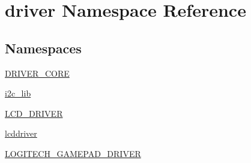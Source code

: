 \hypertarget{namespacedriver}{}\section{driver Namespace Reference}
\label{namespacedriver}
\subsection*{Namespaces}
\begin{DoxyCompactItemize}
\item 
 \hyperlink{namespacedriver_1_1DRIVER__CORE}{D\+R\+I\+V\+E\+R\+\_\+\+C\+O\+R\+E}
\item 
 \hyperlink{namespacedriver_1_1i2c__lib}{i2c\+\_\+lib}
\item 
 \hyperlink{namespacedriver_1_1LCD__DRIVER}{L\+C\+D\+\_\+\+D\+R\+I\+V\+E\+R}
\item 
 \hyperlink{namespacedriver_1_1lcddriver}{lcddriver}
\item 
 \hyperlink{namespacedriver_1_1LOGITECH__GAMEPAD__DRIVER}{L\+O\+G\+I\+T\+E\+C\+H\+\_\+\+G\+A\+M\+E\+P\+A\+D\+\_\+\+D\+R\+I\+V\+E\+R}
\end{DoxyCompactItemize}
